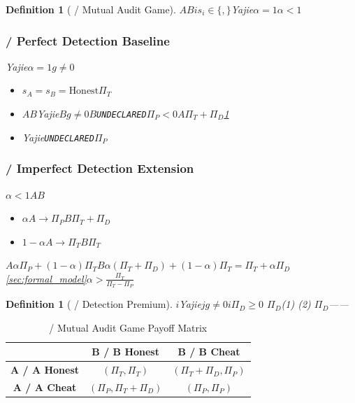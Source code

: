 \documentclass[12pt,a4paper]{article}
\newtheorem{definition}[theorem]{Definition}
\theoremstyle{remark}
\newcommand{\UNDECLARED}{\texttt{UNDECLARED}}
\begin{document}
\begin{definition}[ / Mutual Audit Game]
    $A$$B$$i$$s_i \in \{\text{}, \text{}\}$Yajie$\alpha=1$$\alpha<1$

\subsubsection{ / Perfect Detection Baseline}
    Yajie$\alpha=1$$g\neq 0$
    \begin{itemize}[nosep]
        \item $s_A = s_B = \text{Honest}$$\Pi_T$
        \item $A$$B$Yajie$B$$g \neq 0$$B$\UNDECLARED$\Pi_P < 0$$A$$\Pi_T + \Pi_D$\ref{def:detection_premium}
        \item Yajie\UNDECLARED$\Pi_P$
    \end{itemize}

\subsubsection{ / Imperfect Detection Extension}
    $\alpha<1$$A$$B$
    \begin{itemize}[nosep]
        \item $\alpha$$A$$\to$$\Pi_P$$B$$\Pi_T+\Pi_D$
        \item $1-\alpha$$A$$\to$$\Pi_T$$B$$\Pi_T$
    \end{itemize}
    $A$$\alpha\Pi_P + (1-\alpha)\Pi_T$$B$$\alpha(\Pi_T+\Pi_D) + (1-\alpha)\Pi_T = \Pi_T + \alpha\Pi_D$
    \ref{sec:formal_model}$\alpha > \frac{\Pi_T}{\Pi_T - \Pi_P}$
\end{definition}

\begin{definition}[ / Detection Premium]\label{def:detection_premium}
    $i$Yajie$j$$g \neq 0$$i$$\Pi_D \geq 0$
    $\Pi_D$(1) (2) 
    $\Pi_D$——
\end{definition}



\begin{table}[H]
\centering
\begin{tabular}{c|c|c}
    \toprule
    & \textbf{B / B Honest} & \textbf{B / B Cheat} \\
    \midrule
    \textbf{A / A Honest} & $(\Pi_T, \Pi_T)$ & $(\Pi_T + \Pi_D, \Pi_P)$ \\
    \midrule
    \textbf{A / A Cheat} & $(\Pi_P, \Pi_T + \Pi_D)$ & $(\Pi_P, \Pi_P)$ \\
    \bottomrule
\end{tabular}
\caption{ / Mutual Audit Game Payoff Matrix}
\end{table}
\end{document}
